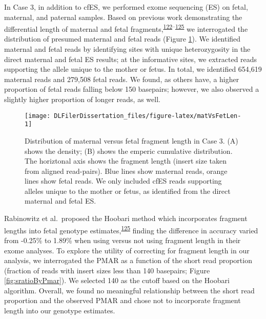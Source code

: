\documentclass[11pt,letterpaper,oneside]{book}
\begin{document}
In Case 3, in addition to cfES, we performed exome sequencing (ES) on fetal, maternal, and paternal samples.
Based on previous work demonstrating the differential length of maternal and fetal fragments,\textsuperscript{\protect\hyperlink{ref-chan:2004aa}{122}--\protect\hyperlink{ref-rabinowitz:2019aa}{125}} we interrogated the distribution of presumed maternal and fetal reads (Figure \ref{fig:matVsFetLen}).
We identified maternal and fetal reads by identifying sites with unique heterozygosity in the direct maternal and fetal ES results; at the informative sites, we extracted reads supporting the allele unique to the mother or fetus.
In total, we identified 654,619 maternal reads and 279,508 fetal reads.
We found, as others have, a higher proportion of fetal reads falling below 150 basepairs; however, we also observed a slightly higher proportion of longer reads, as well.





\begin{figure}

{\centering \texttt{[image: DLFilerDissertation\_files/figure-latex/matVsFetLen-1]} 

}

\caption[Distribution of maternal versus fetal fragment length in Case 3.]{Distribution of maternal versus fetal fragment length in Case 3. (A) shows the density; (B) shows the emperic cumulative distribution. The horiztonal axis shows the fragment length (insert size taken from aligned read-pairs). Blue lines show maternal reads, orange lines show fetal reads. We only included cfES reads supporting alleles unique to the mother or fetus, as identified from the direct maternal and fetal ES.}\label{fig:matVsFetLen}
\end{figure}

Rabinowitz et al.~proposed the Hoobari method which incorporates fragment lengths into fetal genotype estimates,\textsuperscript{\protect\hyperlink{ref-rabinowitz:2019aa}{125}} finding the difference in accuracy varied from -0.25\% to 1.89\% when using versus not using fragment length in their exome analyses.
To explore the utility of correcting for fragment length in our analysis, we interrogated the PMAR as a function of the short read proportion (fraction of reads with insert sizes less than 140 basepairs; Figure \ref{fig:sratioByPmar}).
We selected 140 as the cutoff based on the Hoobari algorithm.
Overall, we found no meaningful relationship between the short read proportion and the observed PMAR and chose not to incorporate fragment length into our genotype estimates.
\end{document}
